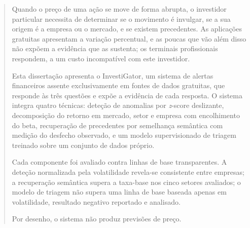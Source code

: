 
\begin{abstract}
Quando o preço de uma ação se move de forma abrupta, o investidor particular necessita de
determinar se o movimento é invulgar, se a sua origem é a empresa ou o mercado, e se existem
precedentes. As aplicações gratuitas apresentam a variação percentual, e as poucas que vão
além disso não expõem a evidência que as sustenta; os terminais profissionais respondem, a
um custo incompatível com este investidor.

Esta dissertação apresenta o InvestiGator, um sistema de alertas financeiros assente exclusivamente
em fontes de dados gratuitas, que responde às três questões e expõe a evidência de cada
resposta. O sistema integra quatro técnicas: deteção de anomalias por \emph{z}-score deslizante,
decomposição do retorno em mercado, setor e empresa com encolhimento do beta, recuperação de
precedentes por semelhança semântica com medição do desfecho observado, e um modelo supervisionado
de triagem treinado sobre um conjunto de dados próprio.

Cada componente foi avaliado contra linhas de base transparentes. A deteção normalizada pela
volatilidade revela-se consistente entre empresas; a recuperação semântica supera a taxa-base nos
cinco setores avaliados; o modelo de triagem não supera uma linha de base baseada apenas em
volatilidade, resultado negativo reportado e analisado.

Por desenho, o sistema não produz previsões de preço.
\end{abstract}

